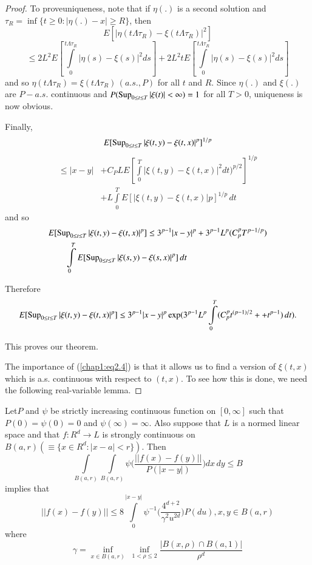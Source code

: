 \begin{proof}
To prove\pageoriginale uniqueness, note that if $\eta(.)$ is a second
solution and $\tau_R = \inf \{ t \geq 0: | \eta(.) - x | \geq  R \}$,
then   
$$
 E[ | \eta ( t \Lambda \tau_R) - \xi( t \Lambda \tau_R)|^2] 
 $$
$$
\leq 2L^2 E[ \int \limits^{t \Lambda \tau_R}_{0} | \eta (s)-
  \xi(s)|^2ds] + 2L^2 tE[ \int \limits^{t \Lambda \tau_R}_{0} | \eta
  (s)- \xi(s)|^2 ds]  
$$
and so $\eta(t \Lambda \tau_R)= \xi(t \Lambda \tau_R) \, (a.s.,P)$ for
all $t$ and $R$. Since $\eta(.)$ and $\xi(.)$ are $P - a.s.$ continuous
and $P( \operatorname{Sup} \limits_{ 0 \leq t \leq T}| \xi(t)|< \infty)=1$ for all
$T> 0$, uniqueness is now obvious. 

Finally, 
$$
E[\operatorname{Sup} \limits_{ 0 \leq t \leq T}| \xi (t,y) - \xi(t,x)|^p]^{1/p} 
$$
\begin{align*}
\leq |x-y| & +C_P L E[ \int \limits^T_0| \xi(t,y) - \xi(t,x)|^2
  dt)^{p/2}]^{1/p} \\ 
& + L \int\limits^T_0 E[|\xi(t,y) - \xi(t,x)|p]^{1/p} \, dt 
\end{align*}
and  so 
\begin{align*}
& E[\operatorname{Sup}\limits_{ 0 \leq t \leq T}| \xi (t,y) - \xi(t,x)|^p] \leq
3^{p-1}|x-y|^p +3^{p-1} L^p(C^p_p T^{p-1/p})\\
& \qquad  \int \limits^T_0  E[\operatorname{Sup}\limits_{0 \leq t \leq T}| \xi
  (s,y) - \xi(s,x)|^p]\,dt  
\end{align*}

Therefore 
{\fontsize{10pt}{12pt}\selectfont
$$
E[\operatorname{Sup}\limits_{ 0 \leq t \leq T}| \xi (t,y) - \xi(t,x)|^p] \leq
3^{p-1}|x-y|^p \exp (3^{p-1} L^p  \int\limits^T_0 (C^p_p t^{(p-1)/2}+ 
+ t^{p-1}) \, dt). 
$$}\relax

This proves our theorem.

The importance of (\ref{chap1:eq2.4}) is that it allows us to find a version of
$\xi(t,x)$ which is a.s. continuous with respect to $(t,x)$.  To see
how this is done, we need the following real-variable lemma.
\end{proof}

\setcounter{lemma}{4}
\begin{lemma}\label{chap1:lem2.5} %
Let\pageoriginale $P$ and $\psi$ be strictly increasing continuous
function on $[0, \infty]$ such that $P(0) = \psi(0)=0$ and
$\psi(\infty) = \infty$. Also suppose that $L$ is a normed linear
space and that $f: R^d \to L$ is strongly continuous on $B(a,r)
(\equiv \{ x \in R^d: |x-a| < r \})$. Then   
$$
\int \limits_{B(a,r)} \int \limits_{B(a,r)} \psi \Bigg( \frac{|| f(x)
  -f(y)||}{P(|x-y|)} \Bigg) dx \, dy \leq B 
$$
implies that
$$
||f(x) -f(y)|| \leq 8 \int \limits^{|x-y|}_0 \psi^{-1} \Bigg(
\frac{4^{d+2}}{\gamma^2 u^{2d}} \Bigg) P(du), x,y \in B(a,r) 
$$
where
$$
\gamma= \inf_{x \in B(a,r)} \; \inf_{ 1 < \rho \leq 2} \frac{|B(x, \rho)
  \cap B(a,1)|}{\rho^d} 
$$
\end{lemma}

